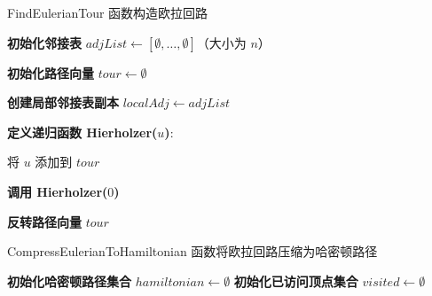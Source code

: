     \begin{algorithm}[htbp]
        \SetAlgoLined
        \caption{FindEulerianTour 函数构造欧拉回路}
        \label{alg:euler}
        
        \BlankLine
        
        \textbf{初始化邻接表} $adjList \leftarrow [\emptyset, \dots, \emptyset]$（大小为 $n$）\;
        
        
        
        \textbf{初始化路径向量} $tour \leftarrow \emptyset$\;
        
        \textbf{创建局部邻接表副本} $localAdj \leftarrow adjList$\;
        
        \textbf{定义递归函数 Hierholzer($u$)}:
        
        将 $u$ 添加到 $tour$\;
        
        \textbf{调用 Hierholzer($0$)}\;
        
        \textbf{反转路径向量} $tour$\;
        
        \;
        
    \end{algorithm}

    \begin{algorithm}[htbp]
        \SetAlgoLined
        \caption{CompressEulerianToHamiltonian 函数将欧拉回路压缩为哈密顿路径}
        \label{alg:hamilton}
        \BlankLine
        
        \textbf{初始化哈密顿路径集合} $hamiltonian \leftarrow \emptyset$\;
        \textbf{初始化已访问顶点集合} $visited \leftarrow \emptyset$\;
        
        
        \;
        
        \end{algorithm}

